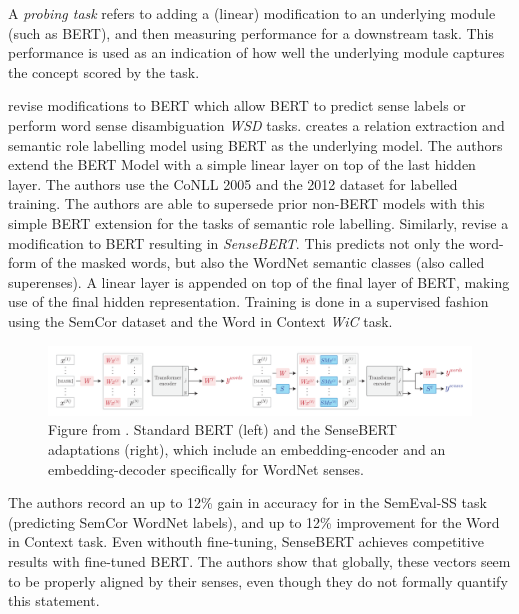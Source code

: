 \documentclass[a4paper,12pt,oneside,openright]{report}
\begin{document}
A \textit{probing task} refers to adding a (linear) modification to an underlying module (such as BERT), and then measuring performance for a downstream task.
This performance is used as an indication of how well the underlying module captures the concept scored by the task.

\cite{shi19, levine19, wiedmann19} revise modifications to BERT which allow BERT to predict sense labels or perform word sense disambiguation \textit{WSD} tasks. 
\cite{shi19} creates a relation extraction and semantic role labelling model using BERT as the underlying model.
The authors extend the BERT Model with a simple linear layer on top of the last hidden layer. 
The authors use the CoNLL 2005 \cite{carreras04} and the 2012  dataset \cite{pradhan13} for labelled training.
The authors are able to supersede prior non-BERT models with this simple BERT extension for the tasks of semantic role labelling. 
Similarly, \cite{levine19} revise a modification to BERT resulting in \textit{SenseBERT}.
This predicts not only the word-form of the masked words, but also the WordNet semantic classes (also called superenses).
A linear layer is appended on top of the final layer of BERT, making use of the final hidden representation.
Training is done in a supervised fashion using the SemCor dataset and the Word in Context \textit{WiC} task.

\begin{figure}
	\center
  \includegraphics[width=\linewidth]{./assets/relatedwork/sensebert.png}
  \caption{Figure from \cite{levine19}. Standard BERT (left) and the SenseBERT adaptations (right), which include an embedding-encoder and an embedding-decoder specifically for WordNet senses.}
  \label{fig:embeddings_by_language}
\end{figure}

The authors record an up to 12\% gain in accuracy for in the SemEval-SS task (predicting SemCor WordNet labels), and up to 12\% improvement for the Word in Context task.
Even withouth fine-tuning, SenseBERT achieves competitive results with fine-tuned BERT.
The authors show that globally, these vectors seem to be properly aligned by their senses, even though they do not formally quantify this statement. \\
\end{document}
